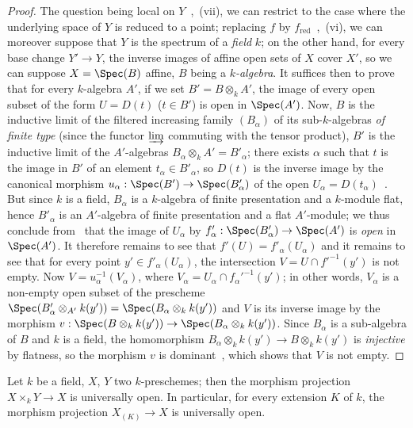 \begin{proof}
The question being local on $Y$~,~(vii), we can restrict to the case where the underlying space of $Y$ is reduced to a point; replacing $f$ by $f_{\mathrm{red}}$~,~(vi), we can moreover suppose that $Y$ is the spectrum of a \emph{field} $k$; on the other hand, for every base change $Y'\to Y$, the inverse images of affine open sets of $X$ cover $X'$, so we can suppose $X=\Spec(B)$ affine, $B$ being a \emph{$k$-algebra}.
It suffices then to prove that for every $k$-algebra $A'$, if we set $B'=B\otimes_k A'$, the image of every open subset of the form $U=D(t)$ ($t\in B'$) is open in $\Spec(A')$.
Now, $B$ is the inductive limit of the filtered increasing family $(B_\alpha)$ of its sub-$k$-algebras \emph{of finite type} (since the functor $\varinjlim$ commuting with the tensor product), $B'$ is the inductive limit of the $A'$-algebras $B_\alpha\otimes_k A'=B'_\alpha$;
there exists $\alpha$ such that $t$ is the image in $B'$ of an element $t_\alpha\in B'_\alpha$, so $D(t)$ is the inverse image by the canonical morphism $u_\alpha:\Spec(B')\to\Spec(B'_\alpha)$ of the open $U_\alpha=D(t_\alpha)$~.
But since $k$ is a field, $B_\alpha$ is a $k$-algebra of finite presentation and a $k$-module flat, hence $B'_\alpha$ is an $A'$-algebra of finite presentation and a flat $A'$-module; we thus conclude from~ that the image of $U_\alpha$ by $f'_\alpha:\Spec(B'_\alpha)\to\Spec(A')$ is \emph{open} in $\Spec(A')$.
It therefore remains to see that $f'(U)=f'_\alpha(U_\alpha)$ and it remains to see that for every point $y'\in f'_\alpha(U_\alpha)$, the intersection $V=U\cap f'^{-1}(y')$ is not empty.
Now $V=u_\alpha^{-1}(V_\alpha)$, where $V_\alpha=U_\alpha\cap f_\alpha'^{-1}(y')$; in other words, $V_\alpha$ is a non-empty open subset of the prescheme $\Spec(B'_\alpha\otimes_{A'}k(y'))=\Spec(B_\alpha\otimes_k k(y'))$ and $V$ is its inverse image by the morphism $v:\Spec(B\otimes_k k(y'))\to\Spec(B_\alpha\otimes_k k(y'))$.
Since $B_\alpha$ is a sub-algebra of $B$ and $k$ is a field, the homomorphism $B_\alpha\otimes_k k(y')\to B\otimes_k k(y')$ is \emph{injective} by flatness, so the morphism $v$ is dominant~, which shows that $V$ is not empty.
\end{proof}


\begin{corollary}[2.4.10]
\label{IV.2.4.10}
Let $k$ be a field, $X$, $Y$ two $k$-preschemes; then the morphism projection $X\times_k Y\to X$ is universally open.
In particular, for every extension $K$ of $k$, the morphism projection $X_{(K)}\to X$ is universally open.
\end{corollary}

